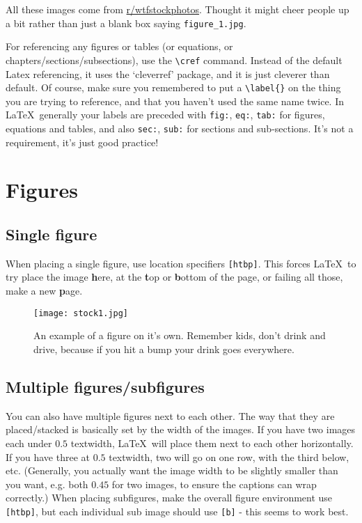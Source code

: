 \documentclass[../main]{subfiles}
\begin{document}
All these images come from \href{http://www.reddit.com/r/wtfstockphotos}{r/wtfstockphotos}. Thought it might cheer people up a bit rather than just a blank box saying \texttt{figure\_1.jpg}.

For referencing any figures or tables (or equations, or chapters/sections/subsections), use the \verb|\cref| command. Instead of the default Latex referencing, it uses the `cleverref' package, and it is just cleverer than default. Of course, make sure you remembered to put a {\verb|\label{}|} on the thing you are trying to reference, and that you haven't used the same name twice. In \LaTeX\, generally your labels are preceded with \texttt{fig:}, \texttt{eq:}, \texttt{tab:} for figures, equations and tables, and also \texttt{sec:}, \texttt{sub:} for sections and sub-sections. It's not a requirement, it's just good practice!

\section{Figures}

\subsection{Single figure}

When placing a single figure, use location specifiers \verb|[htbp]|. This forces \LaTeX\ to try place the image \textbf{h}ere, at the \textbf{t}op or \textbf{b}ottom of the page, or failing all those, make a new \textbf{p}age.

\begin{figure}[htbp]
\centering
\texttt{[image: stock1.jpg]}
\caption[A single figure.]{An example of a figure on it's own. Remember kids, don't drink and drive, because if you hit a bump your drink goes everywhere.}
\label{fig:stock1}
\end{figure}

\subsection{Multiple figures/subfigures}

You can also have multiple figures next to each other. The way that they are placed/stacked is basically set by the width of the images. If you have two images each under $0.5$ textwidth, \LaTeX\ will place them next to each other horizontally. If you have three at $0.5$ textwidth, two will go on one row, with the third below, etc. (Generally, you actually want the image width to be slightly smaller than you want, e.g. both $0.45$ for two images, to ensure the captions can wrap correctly.) When placing subfigures, make the overall figure environment use \verb|[htbp]|, but each individual sub image should use \verb|[b]| - this seems to work best.
\end{document}
